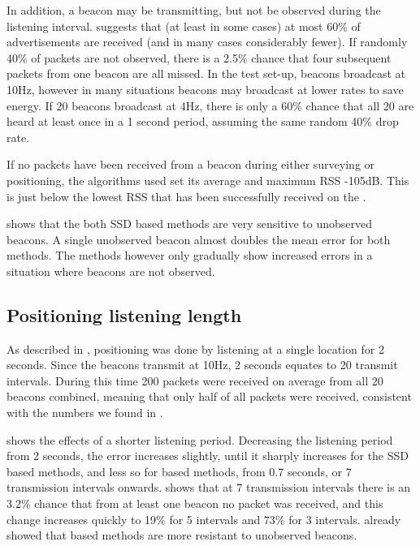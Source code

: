 In addition, a beacon may be transmitting, but not be observed during the listening interval.
 suggests that (at least in some cases) at most 60\% of advertisements are received (and in many cases considerably fewer).
If randomly 40\% of packets are not observed, there is a 2.5\% chance that four subsequent packets from one beacon are all missed.
In the test set-up, beacons broadcast at 10Hz, however in many situations beacons may broadcast at lower rates to save energy.
If 20 beacons broadcast at 4Hz, there is only a 60\% chance that all 20 are heard at least once in a 1 second period, assuming the same random 40\% drop rate.

If no packets have been received from a beacon during either surveying or positioning, the algorithms used set its average and maximum RSS -105dB.
This is just below the lowest RSS that has been successfully received on the \device.

 shows that the both SSD based methods are very sensitive to unobserved beacons.
A single unobserved beacon almost doubles the mean error for both methods.
The \aBRP methods however only gradually show increased errors in a situation where beacons are not observed.

\subsection{Positioning listening length}
\label{sec:architecture-short-walk}
As described in , positioning was done by listening at a single location for 2 seconds.
Since the beacons transmit at 10Hz, 2 seconds equates to 20 transmit intervals.
During this time 200 packets were received on average from all 20 beacons combined, meaning that only half of all packets were received, consistent with the numbers we found in .

 shows the effects of a shorter listening period.
Decreasing the listening period from 2 seconds, the error increases slightly, until it sharply increases for the SSD based methods, and less so for \aBRP based methods, from 0.7 seconds, or 7 transmission intervals onwards.
 shows that at 7 transmission intervals there is an 3.2\% chance that from at least one beacon no packet was received, and this change increases quickly to 19\% for 5 intervals and 73\% for 3 intervals.
 already showed that \aBRP based methods are more resistant to unobserved beacons.

